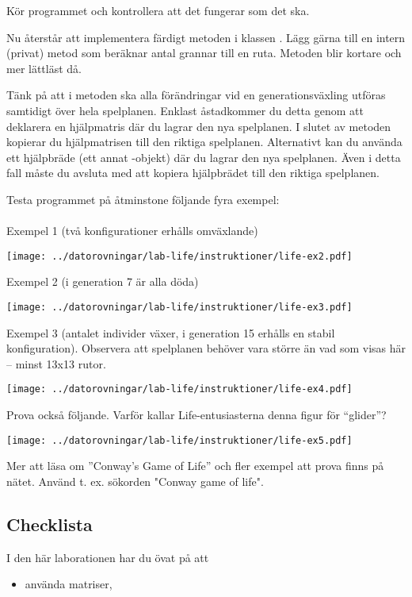 \begin{Datorarbete}
Kör programmet och kontrollera att det fungerar som det ska.

\item Nu återstår att implementera färdigt metoden  i klassen .
Lägg gärna till en intern (privat) metod som beräknar antal grannar till en ruta. Metoden  blir kortare och mer lättläst då.

Tänk på att i metoden  ska alla förändringar vid en generationsväxling utföras samtidigt över hela spelplanen. Enklast åstadkommer du detta genom att deklarera en hjälpmatris där du lagrar den nya spelplanen. I slutet av metoden kopierar du hjälpmatrisen till den riktiga spelplanen. Alternativt kan du använda ett hjälpbräde (ett annat -objekt) där du lagrar den nya spelplanen. Även i detta fall måste du avsluta med att kopiera hjälpbrädet till den riktiga spelplanen.

Testa programmet på åtminstone följande fyra exempel:\\
\\
\n Exempel 1 (två konfigurationer erhålls omväxlande)
\begin{center}
\texttt{[image: ../datorovningar/lab-life/instruktioner/life-ex2.pdf]}
\end{center}

\n Exempel 2 (i generation 7 är alla döda)
\begin{center}
\texttt{[image: ../datorovningar/lab-life/instruktioner/life-ex3.pdf]}
\end{center}

\n Exempel 3 (antalet individer växer, i generation 15 erhålls en stabil
konfiguration). Observera att spelplanen behöver vara större än vad som visas här -- minst 13x13 rutor.
\begin{center}
\texttt{[image: ../datorovningar/lab-life/instruktioner/life-ex4.pdf]}
\end{center}

\n Prova också följande. Varför kallar Life-entusiasterna denna figur för \enquote{glider}?
\begin{center}
\texttt{[image: ../datorovningar/lab-life/instruktioner/life-ex5.pdf]}
\end{center}
Mer att läsa om ''Conway's Game of Life'' och fler exempel att prova finns på nätet. Använd t. ex. sökorden "Conway game of life".

	\subsection*{Checklista}
        I den här laborationen har du övat på att
        \begin{itemize}
            \item använda matriser,


\end{itemize}
\end{Datorarbete}
